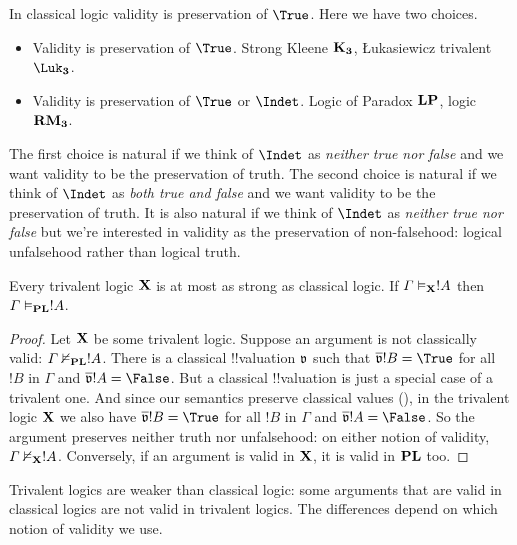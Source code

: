 \documentclass[../../../include/open-logic-section]{subfiles}
\begin{document}


In classical logic validity is preservation of $\True$. Here we have two choices. 

\begin{itemize}
  \item Validity is preservation of $\True$. Strong Kleene $\Log{K_3}$, Łukasiewicz trivalent $\Log{\Luk_3}$. 
  \item Validity is preservation of $\True$ or $\Indet$. Logic of Paradox $\Log{LP}$, logic $\Log{RM_3}$.
\end{itemize}

The first choice is natural if we think of $\Indet$ as \emph{neither true nor false} and we want validity to be the preservation of truth. The second choice is natural if we think of $\Indet$ as \emph{both true and false} and we want validity to be the preservation of truth. It is also natural if we think of $\Indet$ as \emph{neither true nor false} but we're interested in validity as the preservation of non-falsehood: logical unfalsehood rather than logical truth. 

\begin{prop}
  \item Every trivalent logic $\Log X$ is at most as strong as classical logic. If $\Gamma \Entails[\Log X] !A$ then $\Gamma \Entails[\Log{PL}] !A$.
\end{prop}

\begin{proof}
Let $\Log X$ be some trivalent logic. Suppose an argument is not classically valid: $\Gamma \Entails/[\Log{PL}] !A$. There is a classical !!{valuation} $\pAssign{v}$ such that $\pValue{v}{!B} = \True$ for all $!B$ in $\Gamma$ and $\pValue{v}{!A} = \False$. But a classical !!{valuation} is just a special case of a trivalent one. And since our semantics preserve classical values (), in the trivalent logic $\Log X$ we also have $\pValue{v}{!B} = \True$ for all $!B$ in $\Gamma$ and $\pValue{v}{!A} = \False$. So the argument preserves neither truth nor unfalsehood: on either notion of validity, $\Gamma \Entails/[\Log X] !A$. Conversely, if an argument is valid in $\Log X$, it is valid in $\Log{PL}$ too.
\end{proof}

Trivalent logics are weaker than classical logic: some arguments that are valid in classical logics are not valid in trivalent logics. The differences depend on which notion of validity we use.
\end{document}
